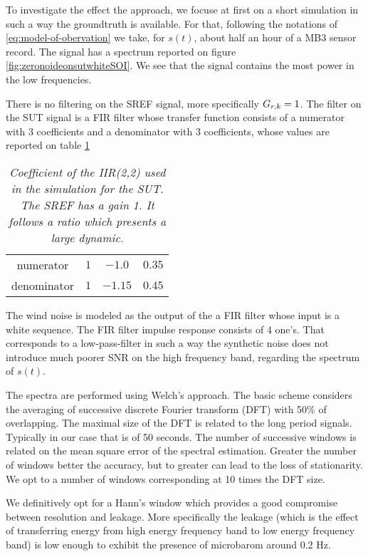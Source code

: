 To investigate the effect the approach, we focuse at first on a short simulation in such a way the groundtruth is available. For that, following the notations of \eqref{eq:model-of-obervation} we take, for $s(t)$, about half an hour of a MB3 sensor record. The signal has a spectrum reported on figure \ref{fig:zeronoideonsutwhiteSOI}. We see that the signal contains the most power in the low frequencies.

There is no filtering on the SREF signal, more specifically $G_{{r},k}=1$.  The filter on the SUT signal is a FIR filter whose transfer function consists of a numerator with 3 coefficients and a denominator with 3 coefficients, whose values are reported on table \ref{tab:UT-sensor}
\begin{table}[h]
\begin{center}
\begin{tabular}{|c| c c c||}
\hline
numerator  & $1$ &$-1.0$ &$0.35$
\\
denominator  &$1$ &$-1.15$& $0.45$  
\\
\hline
\end{tabular}
\parbox{12 cm}
{
    \caption{\protect\small\it  Coefficient of the IIR(2,2) used in the simulation for the SUT. The SREF  has a gain 1. It follows a ratio which presents a large dynamic. }
    \label {tab:UT-sensor}
}
\end{center}
\end{table}


The wind noise is modeled as the output of the a FIR filter whose input is a white sequence. The FIR filter impulse response consists of $4$ one's. That corresponds to a low-pass-filter in such a way the synthetic noise does not introduce much poorer SNR on the high frequency band, regarding the spectrum of $s(t)$.

The spectra are performed using Welch's approach. The basic scheme considers the averaging of successive discrete Fourier transform (DFT) with 50\% of overlapping. The maximal size of the DFT is related to the long period signals. Typically in our case that is of 50 seconds. The number of successive windows is related on the mean square error of the spectral estimation. Greater the number of windows better the accuracy, but to greater can lead to the loss of stationarity. We opt to a number of windows corresponding at 10 times the DFT size.

We definitively opt for a Hann's window which provides a good compromise between resolution and leakage. More specifically the leakage (which is the effect of transferring energy from high energy frequency band to low energy frequency band) is low enough to exhibit the presence of microbarom around 0.2 Hz. 

